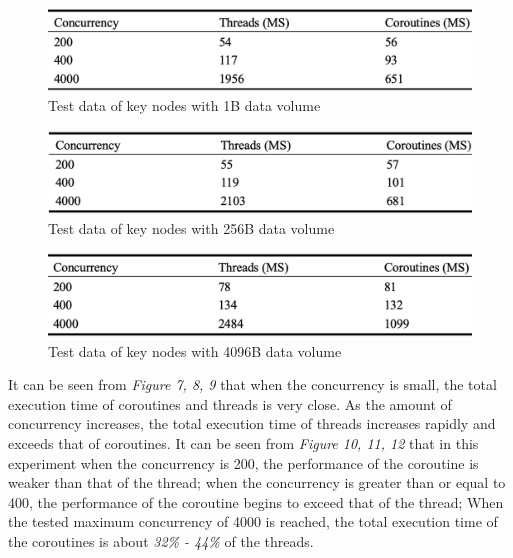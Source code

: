 \documentclass[10pt]{article}
\begin{document}
\begin{figure}[ht]
\begin{center}
\centerline{\includegraphics[width=\columnwidth]{1B_table.png}}
\caption{Test data of key nodes with 1B data volume}
\label{bayespic}
\end{center}
\end{figure}

\begin{figure}[ht]
\begin{center}
\centerline{\includegraphics[width=\columnwidth]{256B_table.png}}
\caption{Test data of key nodes with 256B data volume}
\label{256B_table}
\end{center}
\end{figure}

\begin{figure}[ht]
\begin{center}
\centerline{\includegraphics[width=\columnwidth]{4096B_table.png}}
\caption{Test data of key nodes with 4096B data volume}
\label{4096B_table}
\end{center}
\end{figure}

It can be seen from \textit{Figure 7, 8, 9} that when the concurrency is small, the total execution time of coroutines and threads is very close. As the amount of concurrency increases, the total execution time of threads increases rapidly and exceeds that of coroutines. It can be seen from \textit{Figure 10, 11, 12} that in this experiment when the concurrency is 200, the performance of the coroutine is weaker than that of the thread; when the concurrency is greater than or equal to 400, the performance of the coroutine begins to exceed that of the thread; When the tested maximum concurrency of 4000 is reached, the total execution time of the coroutines is about \textit{32\% - 44\%} of the threads.
\end{document}
